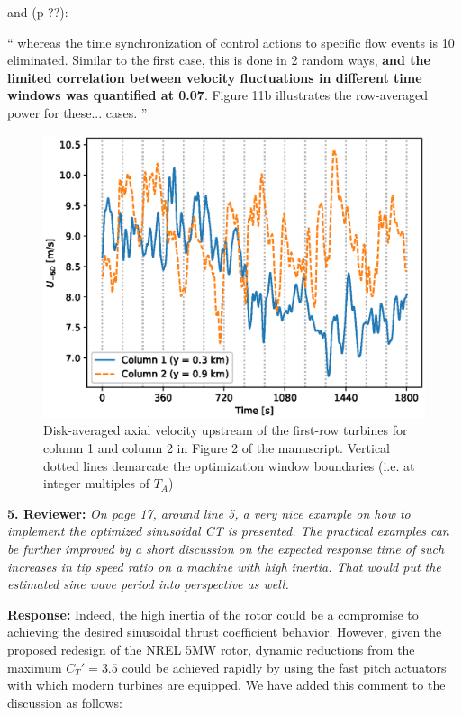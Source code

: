 \documentclass[]{article}
\begin{document}
and (p ??):

``
whereas the time synchronization of control actions to specific flow events is 10 eliminated. Similar to the first case, this is done in 2 random ways, \textbf{and the limited correlation between velocity fluctuations in different time windows was quantified at 0.07}. Figure 11b illustrates the row-averaged power for these...
cases.
''

\begin{figure}
	\includegraphics[width=\textwidth]{upstream_vel.eps}
	\caption{Disk-averaged axial velocity upstream of the first-row turbines for column 1 and column 2 in Figure 2 of the manuscript. Vertical dotted lines demarcate the optimization window boundaries (i.e. at integer multiples of $T_A$) \label{fig:upstream_vel}}
\end{figure}

\dotfill

\textbf{5. Reviewer: } \textit{On page 17, around line 5, a very nice example on how to implement the optimized
	sinusoidal CT is presented. The practical examples can be further improved by a
	short discussion on the expected response time of such increases in tip speed ratio
	on a machine with high inertia. That would put the estimated sine wave period into
	perspective as well.}

\textbf{Response: } Indeed, the high inertia of the rotor could be a compromise to achieving the desired sinusoidal thrust coefficient behavior. However, given the proposed redesign of the NREL 5MW rotor, dynamic reductions from the maximum $C_T' = 3.5$ could be achieved rapidly by using the fast pitch actuators with which modern turbines are equipped. We have added this comment to the discussion as follows:  
\end{document}
